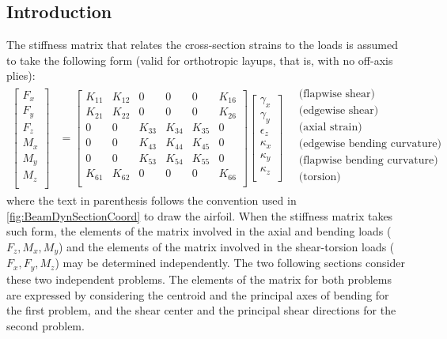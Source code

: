 \documentclass[11pt]{article}
\begin{document}
\subsection{Introduction}
The stiffness matrix that relates the cross-section strains to the loads is assumed to take the following form (valid for orthotropic layups, that is, with no off-axis plies):
\begin{align}
    \begin{bmatrix}
    F_x \\ F_y\\ F_z \\ M_x \\ M_y\\ M_z\\ 
    \end{bmatrix}
&=
    \begin{bmatrix}
K_{11} & K_{12} & 0      & 0      & 0      & K_{16} \\
K_{21} & K_{22} & 0      & 0      & 0      & K_{26} \\
0      & 0      & K_{33} & K_{34} & K_{35} & 0      \\
0      & 0      & K_{43} & K_{44} & K_{45} & 0      \\
0      & 0      & K_{53} & K_{54} & K_{55} & 0      \\
K_{61} & K_{62} & 0      & 0       & 0  & K_{66} \\
\end{bmatrix}
    \begin{bmatrix}
    \gamma_{x} \\ \gamma_{y} \\     \epsilon_z \\ \kappa_x \\ \kappa_y\\ \kappa_z \\
    \end{bmatrix}
     \quad
    \begin{matrix}
   \text{(flapwise shear)}\\
   \text{(edgewise shear)}\\
   \text{(axial strain)}\\
   \text{(edgewise bending curvature)}\\
   \text{(flapwise bending curvature)}\\
   \text{(torsion)}\\
    \end{matrix}
\end{align}
where the text in parenthesis follows the convention used in \autoref{fig:BeamDynSectionCoord} to draw the airfoil.
When the stiffness matrix takes such form, the elements of the matrix involved in the axial and bending loads ($F_z,M_x,M_y$) and the elements of the matrix involved in the shear-torsion loads ($F_x,F_y,M_z$) may be determined independently. The two following sections consider these two independent problems. The elements of the matrix for both problems are expressed by considering the centroid and the principal axes of bending for the first problem, and the shear center and the principal shear directions for the second problem.
\end{document}
